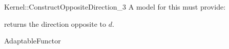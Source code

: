 \begin{ccRefFunctionObjectConcept}{Kernel::ConstructOppositeDirection_3}
A model for this must provide:


 {returns the direction opposite to $d$.}

\ccRefines
AdaptableFunctor

\ccSeeAlso
{} \\

\end{ccRefFunctionObjectConcept}
